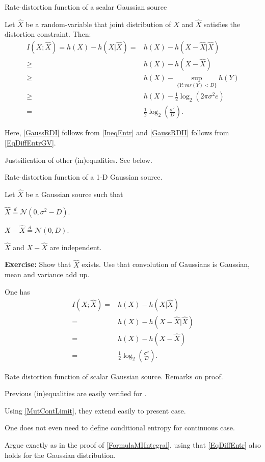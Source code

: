 \begin{frame}{Rate-distortion function of a scalar Gaussian source}
\bit
\item Let $\hat{X}$ be a random-variable that joint distribution of $X$ and $\hat{X}$ satisfies the distortion constraint. Then: 
\begin{align}
I(X;\hat{X})=h(X)-h(X|\hat{X})
= & h(X)-h(X-\hat{X}|\hat{X})\nonumber\\
\geq & h(X)- h(X-\hat{X})\nonumber\\
\geq & h(X) - \sup_{\{Y\colon var(Y)<D\}}h(Y)\nonumber\\
\geq & h(X) - \frac{1}{2}\log_2(2\pi\sigma^2 e)\label{GaussRDI}\\
=& \frac{1}{2}\log_2\left(\frac{\sigma^2}{D}\right)\label{GaussRDII}. 
\end{align}
\item Here, \eqref{GaussRDI} follows from \eqref{IneqEntr} and \eqref{GaussRDII} follows from \eqref{EqDiffEntrGV}. 
\item Justsification of other (in)equalities. See below. 
\eit

\end{frame}




\begin{frame}{Rate-distortion function of a 1-D Gaussian source.}
\bit
\item Let $\hat{X}$ be a Gaussian source such that
\bit
\item $\hat{X}\stackrel{d}{=} \mathcal{N}(0,\sigma^2-D)$.
\item $X-\hat{X}\stackrel{d}{=} \mathcal{N}(0,D)$.
\item $\hat{X}$ and $X-\hat{X}$ are independent.
\eit
\item \textbf{Exercise: } Show that $\hat{X}$ exists. Use that convolution of Gaussians is Gaussian, mean and variance add up. 
\item One has
\begin{align*}
I(X;\hat{X})=&h(X)-h(X|\hat{X})\\
=&h(X)-h(X-\hat{X}|\hat{X})\\
=&h(X)-h(X-\hat{X})\\
=& \frac{1}{2}\log_2\left(\frac{\sigma^2}{D}\right).
\end{align*}
\eit
\end{frame}

\begin{frame}{Rate distortion function of scalar Gaussian source. Remarks on proof.}
\bit
\item  Previous (in)equalities are easily verified for .
\item Using \eqref{MutContLimit},  they extend easily to present case. 
\item One does not even need to define conditional entropy for continuous case.
\item  Argue exactly as in the proof of \eqref{FormulaMIIntegral}, using that \eqref{EqDiffEntr} also holds for the Gaussian distribution. 
\eit
\end{frame}

